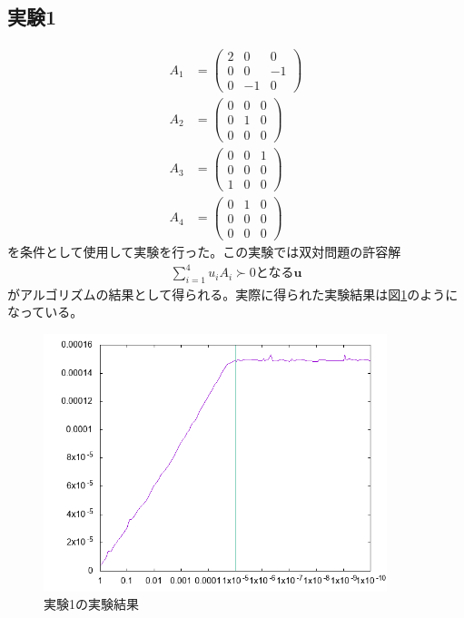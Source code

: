 \subsection{実験1}
\begin{align*}
  A_1 & = \left(
            \begin{array}{ccc}
              2 &  0 &  0 \\
              0 &  0 & -1 \\
              0 & -1 &  0
            \end{array}
          \right) \\
  A_2 & = \left(
            \begin{array}{ccc}
              0 & 0 & 0 \\
              0 & 1 & 0 \\
              0 & 0 & 0
            \end{array}
          \right) \\
  A_3 & = \left(
            \begin{array}{ccc}
              0 & 0 & 1 \\
              0 & 0 & 0 \\
              1 & 0 & 0
            \end{array}
          \right) \\
  A_4 & = \left(
            \begin{array}{ccc}
              0 & 1 & 0 \\
              0 & 0 & 0 \\
              0 & 0 & 0
            \end{array}
          \right)
\end{align*}
を条件として使用して実験を行った。この実験では双対問題の許容解
\begin{align} \label{test1-results}
  \displaystyle{\sum_{i = 1}^4} u_i A_i \succ 0\text{となる}\mathbf{u}
\end{align}
がアルゴリズムの結果として得られる。実際に得られた実験結果は図\ref{test1}のようになっている。
\begin{figure}
  \centering
  \includegraphics[width=10cm]{test1.png}
  \caption{実験1の実験結果}
  \label{test1}
\end{figure}

